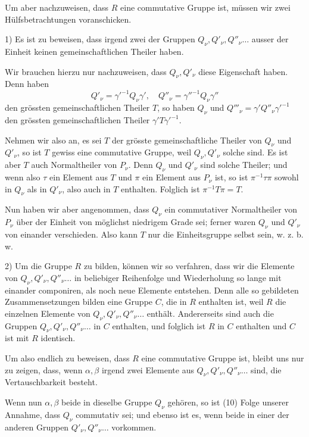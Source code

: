 Um aber nachzuweisen, dass $R$ eine commutative Gruppe ist, müssen wir zwei Hülfsbetrachtungen voranschicken.

1) Es ist zu beweisen, dass irgend zwei der Gruppen $Q_\nu, Q'_\nu, Q''_\nu \ldots$ ausser der Einheit keinen gemeinschaftlichen Theiler haben.

Wir brauchen hierzu nur nachzuweisen, dass $Q_\nu, Q'_\nu$ diese Eigenschaft haben. Denn haben
\[ Q'_\nu = \gamma'^{-1} Q_\nu \gamma', \quad Q''_\nu = \gamma''^{-1} Q_\nu \gamma'' \]
den grössten gemeinschaftlichen Theiler $T$, so haben $Q_\nu$ und $Q'''_\nu = \gamma' Q''_\nu \gamma'^{-1}$ den grössten gemeinschaftlichen Theiler $\gamma' T \gamma'^{-1}$.

Nehmen wir also an, es sei $T$ der grösste gemeinschaftliche Theiler von $Q_\nu$ und $Q'_\nu$, so ist $T$ gewiss eine commutative Gruppe, weil $Q_\nu, Q'_\nu$ solche sind. Es ist aber $T$ auch Normaltheiler von $P_\nu$. Denn $Q_\nu$ und $Q'_\nu$ sind solche Theiler; und wenn also $\tau$ ein Element aus $T$ und $\pi$ ein Element aus $P_\nu$ ist, so ist $\pi^{-1}\tau\pi$ sowohl in $Q_\nu$ als in $Q'_\nu$, also auch in $T$ enthalten. Folglich ist $\pi^{-1} T \pi = T$.

Nun haben wir aber angenommen, dass $Q_\nu$ ein commutativer Normaltheiler von $P_\nu$ über der Einheit von möglichst niedrigem Grade sei; ferner waren $Q_\nu$ und $Q'_\nu$ von einander verschieden. Also kann $T$ nur die Einheitsgruppe selbst sein, w. z. b. w.

2) Um die Gruppe $R$ zu bilden, können wir so verfahren, dass wir die Elemente von $Q_\nu, Q'_\nu, Q''_\nu \ldots$ in beliebiger Reihenfolge und Wiederholung so lange mit einander componiren, als noch neue Elemente entstehen. Denn alle so gebildeten Zusammensetzungen bilden eine Gruppe $C$, die in $R$ enthalten ist, weil $R$ die einzelnen Elemente von $Q_\nu, Q'_\nu, Q''_\nu \ldots$ enthält. Andererseits sind auch die Gruppen $Q_\nu, Q'_\nu, Q''_\nu \ldots$ in $C$ enthalten, und folglich ist $R$ in $C$ enthalten und $C$ ist mit $R$ identisch.

Um also endlich zu beweisen, dass $R$ eine commutative Gruppe ist, bleibt uns nur zu zeigen, dass, wenn $\alpha, \beta$ irgend zwei Elemente aus $Q_\nu, Q'_\nu, Q''_\nu \ldots$ sind, die Vertauschbarkeit
besteht.

Wenn nun $\alpha, \beta$ beide in dieselbe Gruppe $Q_\nu$ gehören, so ist (10) Folge unserer Annahme, dass $Q_\nu$ commutativ sei; und ebenso ist es, wenn beide in einer der anderen Gruppen $Q'_\nu, Q''_\nu \ldots$ vorkommen.
